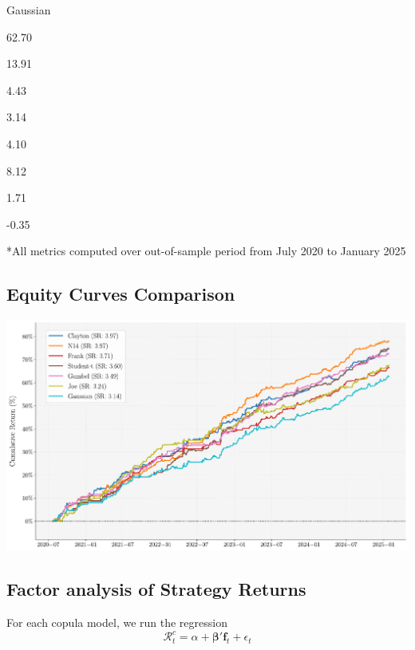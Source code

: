 \documentclass[
  letterpaper,
  DIV=11,
  numbers=noendperiod]{scrartcl}
\begin{document}
Gaussian

62.70

13.91

4.43

3.14

4.10

8.12

1.71

-0.35

*All metrics computed over out-of-sample period from July 2020 to
January 2025

\subsection{Equity Curves Comparison}\label{equity-curves-comparison}

\begin{center}
\includegraphics[width=0.9\linewidth,height=\textheight,keepaspectratio]{simple_Presentation_files/mediabag/images/converted/equity_curves_comparison.pdf}
\end{center}

\subsection{Factor analysis of Strategy
Returns}\label{factor-analysis-of-strategy-returns}

For each copula model, we run the regression \[
\mathcal{R}_{t}^{c} = \alpha + \boldsymbol{\beta}' \mathbf{f}_t + \epsilon_t
\]
\end{document}
